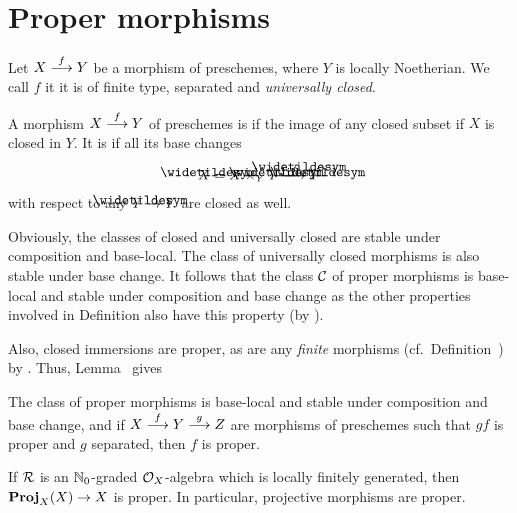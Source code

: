 \documentclass[a4paper,parskip=half,numbers=enddot, DIV=12]{scrreprt}
\begin{document}
\section{Proper morphisms}
\begin{defi}
	Let $X\morphism[f]Y$ be a morphism of preschemes, where $Y$ is locally Noetherian. We call $f$  it it is of finite type, separated and \emph{universally closed}.
\end{defi}
\begin{defi}
	A morphism $X\morphism[f]Y$ of preschemes is  if the image of any closed subset if $X$ is closed in $Y$. It is  if all its base changes 
	\begin{align*}
		\snake{X}=X\times_Y\snake{Y}\morphism[\snake{f}]\snake{Y}
	\end{align*}
	with respect to any $\snake{Y}\morphism Y$ are closed as well.
\end{defi}
\begin{rem*}
	Obviously, the classes of closed and universally closed are stable under composition and base-local. The class of universally closed morphisms is also stable under base change. It follows that the class $\mathcal{C}$ of proper morphisms is base-local and stable under composition and base change as the other properties involved in Definition also have this property (by \cite[Fact~1.5.7 and Fact~2.2.2]{alggeo1}).
	
	Also, closed immersions are proper, as are any \emph{finite} morphisms (cf.\ Definition~) by \cite[Example~2.6.1]{alggeo1}. Thus, Lemma~ gives
\end{rem*}
\begin{prop}
	The class of proper morphisms is base-local and stable under composition and base change, and if $X\morphism[f]Y\morphism[g]Z$ are morphisms of preschemes such that $gf$ is proper and $g$ separated, then $f$ is proper.
\end{prop}
\begin{prop}
	If $\mathcal{R}$ is an $\mathbb{N}_0$-graded $\mathcal{O}_X$-algebra which is locally finitely generated, then $\PROJ_X(X)\morphism X$ is proper. In particular, projective morphisms are proper.
\end{prop}
\end{document}
